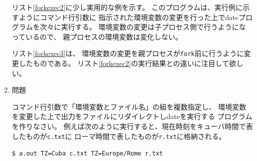 \documentclass[a4j,dvipdfmx]{jarticle}
\begin{document}
\begin{enumerate}


リスト\ref{forkexec2}に少し実用的な例を示す。
このプログラムは、実行例に示すようにコマンド行引数に
指示された環境変数の変更を行った上でdateプログラムを次々に実行する。
環境変数の変更は子プロセス側で行うようになっているので、
親プロセスの環境変数は変化しない。




リスト\ref{forkexec3}は、
環境変数の変更を親プロセスが\verb/fork/前に行うように変更したものである。
リスト\ref{forkexec2}の実行結果との違いに注目して欲しい。



\item 問題

コマンド行引数で「環境変数とファイル名」の組を複数指定し、
環境変数を変更した上で出力をファイルにリダイレクトしdateを実行する
プログラムを作りなさい。
例えば次のように実行すると、現在時刻をキューバ時間で表したものが\verb/c.txt/に
ローマ時間で表したものが\verb/r.txt/に格納される。

\verb;$ a.out TZ=Cuba c.txt TZ=Europe/Rome r.txt;

\end{enumerate}
\end{document}
